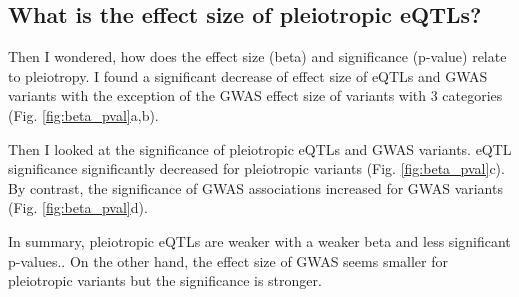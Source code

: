 \subsection*{What is the effect size of pleiotropic eQTLs?}

Then I wondered, how does the effect size (beta) and significance (p-value) relate to pleiotropy.
%
I found a significant decrease of effect size of eQTLs and GWAS variants with the exception of the GWAS effect size of variants with 3 categories (Fig. \ref{fig:beta_pval}a,b).

Then I looked at the significance of pleiotropic eQTLs and GWAS variants.
%
eQTL significance significantly decreased for pleiotropic variants (Fig. \ref{fig:beta_pval}c).
%
By contrast, the significance of GWAS associations increased for GWAS variants (Fig. \ref{fig:beta_pval}d).

In summary, pleiotropic eQTLs are weaker with a weaker beta and less significant p-values..
%
On the other hand, the effect size of GWAS seems smaller for pleiotropic variants but the significance is stronger.

